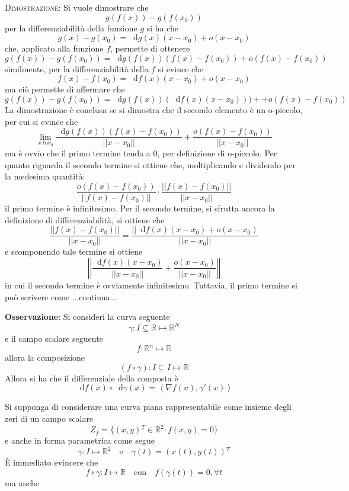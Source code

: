 \documentclass[a4paper]{extarticle}
\newcommand*\dif{\mathop{}\!\mathrm{d}}
\begin{document}
\vspace{2em}
\noindent
\normalfont \normalsize
\textsc{Dimostrazione}: Si vuole dimostrare che
\[g(f(x))-g(f(x_0))\]
per la differenziabilità della funzione $g$ si ha che
\[g(x) - g(x_0) = \dif g(x)(x-x_0) + o(x-x_0)\]
che, applicato alla funzione $f$, permette di ottenere
\[g(f(x)) - g(f(x_0)) = \dif g(f(x))(f(x)-f(x_0)) + o(f(x)-f(x_0))\]
similmente, per la differenziabilità della $f$ si evince che
\[f(x) - f(x_0) = \dif f(x)(x-x_0) + o(x-x_0)\]
ma ciò permette di affermare che
\[g(f(x)) - g(f(x_0)) = \dif g(f(x))(\dif f(x) (x-x_0))) + + o(f(x)-f(x_0))\]
La dimostrazione è conclusa se si dimostra che il secondo elemento è un o-piccolo, per cui si evince che
\[\lim_{x\ to x_0} \frac{\dif g(f(x))(f(x)-f(x_0))}{\vert \vert x-x_0 \vert \vert} + \frac{o \left(f(x)-f(x_0)\right)}{\vert \vert x-x_0 \vert \vert}\]
ma è ovvio che il primo termine tenda a $0$, per definizione di o-piccolo. Per quanto riguarda il secondo termine si ottiene che, moltiplicando e dividendo per la medesima quantità:
\[\frac{o \left(f(x)-f(x_0)\right)}{\vert \vert f(x) - f(x_0) \vert \vert} \cdot \frac{\vert \vert f(x) - f(x_0) \vert \vert}{\vert \vert x - x_0 \vert \vert}\]
il primo termine è infinitesimo. Per il secondo termine, si sfrutta ancora la definizione di differenziabilità, si ottiene che
\[\frac{\vert \vert f(x) - f(x_0) \vert \vert}{\vert \vert x - x_0 \vert \vert} = \frac{\vert \vert \dif f(x)(x-x_0) + o(x-x_0)}{\vert \vert x-x_0\vert \vert}\]
e scomponendo tale termine si ottiene
\[\left \vert \left \vert \frac{\dif f(x)(x-x_0)}{\vert \vert x-x_0\vert\vert} + \frac{o(x-x_0)}{\vert \vert x-x_0 \vert \vert}\right \vert \right \vert\]
in cui il secondo termine è ovviamente infinitesimo. Tuttavia, il primo termine si può scrivere come ...continua...

\vspace{2em}
\noindent
\textbf{Osservazione}: Si consideri la curva seguente
\[\gamma : I \subseteq \mathbb{R} \longmapsto \mathbb{R}^N\]
e il campo scalare seguente
\[f : \mathbb{R}^n \longmapsto \mathbb{R}\]
allora la composizione
\[\left(f \circ \gamma\right) : I \subseteq I \longmapsto \mathbb{R}\]
Allora si ha che il differenziale della composta è
\[\dif f(x) \circ \dif \gamma(x) = \left<\nabla f(x), \gamma'(x)\right>\]

\vspace{2em}
\noindent
Si supponga di considerare una curva piana rappresentabile come insieme degli zeri di un campo scalare
\[Z_f = \{(x,y){^T} \in \mathbb{R}^2 : f(x,y) = 0\}\]
e anche in forma parametrica come segue
\[\gamma : I \longmapsto \mathbb{R}^2 \hspace{1em} \text{e} \hspace{1em} \gamma(t) = (x(t),y(t)){^T}\]
È immediato evincere che
\[f \circ \gamma : I \longmapsto \mathbb{R} \hspace{1em} \text{con} \hspace{1em} f(\gamma(t)) = 0, \forall t\]
ma anche
\end{document}
